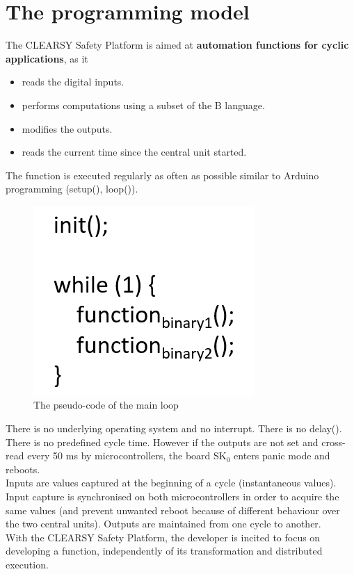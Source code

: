 \section{The programming model}

The CLEARSY Safety Platform is aimed at \textbf{automation functions for cyclic applications}, as it 
\begin{itemize}
    \item reads the digital inputs.
    \item performs computations using a subset of the B language.
    \item modifies the outputs.
    \item reads the current time since the central unit started.
\end{itemize}
The function is executed regularly as often as possible similar to Arduino programming (setup(), loop()). 
  \begin{figure}[ht]
\centering\includegraphics[scale=0.3]{Pictures/chapterProgramming/main-loop-pseudo-code.png}
\caption{The pseudo-code of the main loop}
\end{figure}  
There is no underlying operating system and no interrupt. 
There is no delay(). There is no predefined cycle time. However if the outputs are not set and cross-read every 50 ms by microcontrollers, the board SK$_0$ enters panic mode and reboots.\\
Inputs are values captured at the beginning of a cycle (instantaneous values). Input capture is synchronised on both microcontrollers in order to acquire the same values (and prevent unwanted reboot because of different behaviour over the two central units). Outputs are maintained from one cycle to another.\\

With the CLEARSY Safety Platform, the developer is incited to focus on developing a function, independently of its transformation and distributed execution. 

